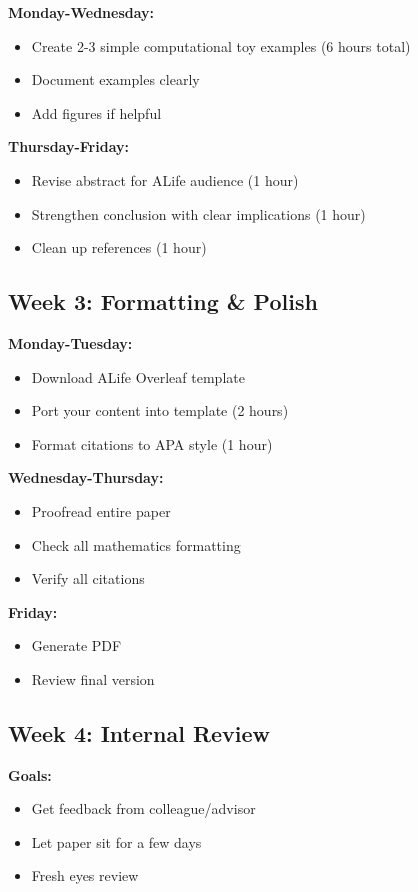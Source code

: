 \documentclass[11pt]{article}
\begin{document}
\textbf{Monday-Wednesday:}
\begin{itemize}[leftmargin=*]
    \item Create 2-3 simple computational toy examples (6 hours total)
    \item Document examples clearly
    \item Add figures if helpful
\end{itemize}

\textbf{Thursday-Friday:}
\begin{itemize}[leftmargin=*]
    \item Revise abstract for ALife audience (1 hour)
    \item Strengthen conclusion with clear implications (1 hour)
    \item Clean up references (1 hour)
\end{itemize}

\subsection*{Week 3: Formatting \& Polish}

\textbf{Monday-Tuesday:}
\begin{itemize}[leftmargin=*]
    \item Download ALife Overleaf template
    \item Port your content into template (2 hours)
    \item Format citations to APA style (1 hour)
\end{itemize}

\textbf{Wednesday-Thursday:}
\begin{itemize}[leftmargin=*]
    \item Proofread entire paper
    \item Check all mathematics formatting
    \item Verify all citations
\end{itemize}

\textbf{Friday:}
\begin{itemize}[leftmargin=*]
    \item Generate PDF
    \item Review final version
\end{itemize}

\subsection*{Week 4: Internal Review}

\textbf{Goals:}
\begin{itemize}[leftmargin=*]
    \item Get feedback from colleague/advisor
    \item Let paper sit for a few days
    \item Fresh eyes review
\end{itemize}
\end{document}
